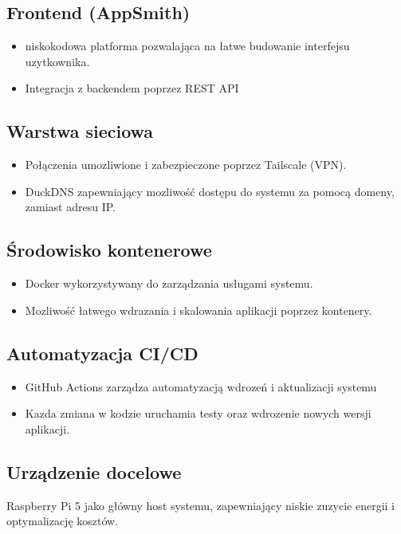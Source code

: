 \subsection{Frontend (AppSmith)}
\begin{itemize}
    \item niskokodowa platforma pozwalająca na łatwe budowanie interfejsu uzytkownika.
    \item Integracja z backendem poprzez REST API
\end{itemize}

\subsection{Warstwa sieciowa}
\begin{itemize}
    \item Połączenia umozliwione i zabezpieczone poprzez Tailscale (VPN).
    \item DuckDNS zapewniający mozliwość dostępu do systemu za pomocą domeny, zamiast adresu IP.
\end{itemize}

\subsection{Środowisko kontenerowe}
\begin{itemize}
    \item Docker wykorzystywany do zarządzania usługami systemu.
    \item Mozliwość łatwego wdrazania i skalowania aplikacji poprzez kontenery.
\end{itemize}

\subsection{Automatyzacja CI/CD}
\begin{itemize}
    \item GitHub Actions zarządza automatyzacją wdrozeń i aktualizacji systemu
    \item Kazda zmiana w kodzie uruchamia testy oraz wdrozenie nowych wersji aplikacji.
\end{itemize}

\subsection{Urządzenie docelowe}

Raspberry Pi 5 jako główny host systemu, zapewniający niskie zuzycie energii i optymalizację kosztów.

